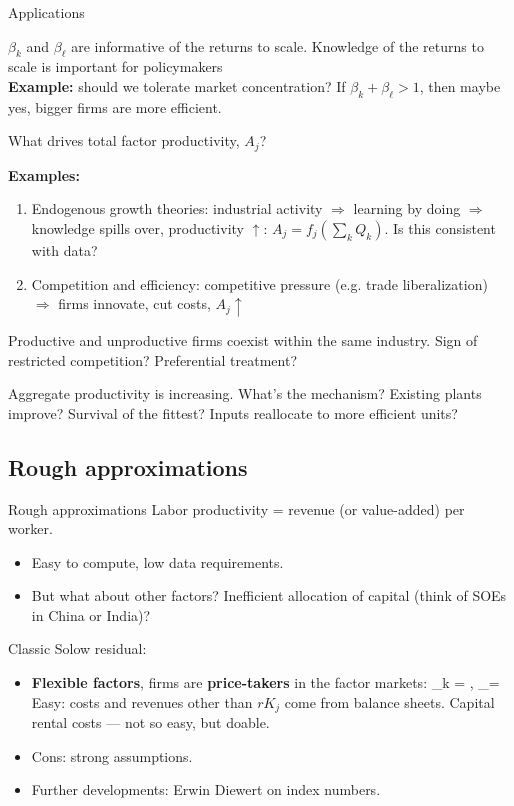 \begin{frame}{Applications}
	\bi
		\item{$\beta_k$ and $\beta_\ell$ are informative of the returns to scale. Knowledge of the returns to scale is important for policymakers\\\smallskip
		\textbf{Example:} should we tolerate market concentration? If $\beta_k + \beta_\ell > 1$, then maybe yes, bigger firms are more efficient.}
		
		\item{What drives total factor productivity, $A_j$?\\\smallskip
		
		\textbf{Examples:} 
		\begin{enumerate}
			\item{Endogenous growth theories: industrial activity $\Rightarrow$ learning by doing $\Rightarrow$ knowledge spills over, productivity $\uparrow$: $A_j = f_j(\sum_kQ_k)$. Is this consistent with data?}
			\item{Competition and efficiency: competitive pressure (e.g. trade liberalization) $\Rightarrow$ firms innovate, cut costs, $A_j\uparrow$}
		\end{enumerate}}
		\item{Productive and unproductive firms coexist within the same industry. Sign of restricted competition? Preferential treatment?}
		\item{Aggregate productivity is increasing. What's the mechanism? Existing plants improve? Survival of the fittest? Inputs reallocate to more efficient units?}
	\ei
\end{frame}

\subsection{Rough approximations}
\begin{frame}{Rough approximations}
	Labor productivity = revenue (or value-added) per worker.
	\begin{itemize}
		\item{Easy to compute, low data requirements.}
		\item{But what about other factors? Inefficient allocation of capital (think of SOEs in China or India)?}
	\end{itemize}
	Classic Solow residual:
	\begin{itemize}
		\item{\textbf{Flexible factors}, firms are \textbf{price-takers} in the factor markets:
		\be
			\beta_k = , \quad \beta_\ell = 
		\ee
		Easy: costs and revenues other than $rK_j$ come from balance sheets. Capital rental costs --- not so easy, but doable.}
		\item{Cons: strong assumptions.}
		\item{Further developments: Erwin Diewert on index numbers.}
	\end{itemize}
\end{frame}


